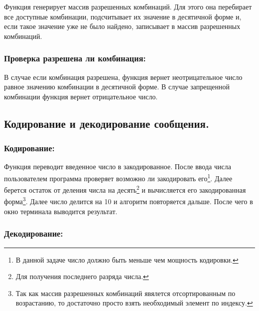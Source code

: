 \documentclass[12pt, a4paper]{report}
\begin{document}


Функция генерирует массив разрешенных комбинаций. Для этого она перебирает все доступные комбинации, подсчитывает их значение в десятичной форме и, если такое значение уже не было найдено, записывает в массив разрешенных комбинаций.

\subsubsection*{Проверка разрешена ли комбинация:}



В случае если комбинация разрешена, функция вернет неотрицательное число равное значению комбинации в десятичной форме. В случае запрещенной комбинации функция вернет отрицательное число.

\newpage

\subsection*{Кодирование и декодирование сообщения.}

\subsubsection*{Кодирование:}



Функция переводит введенное число в закодированное. После ввода числа пользователем программа проверяет возможно ли закодировать его\footnote{В данной задаче число должно быть меньше чем мощность кодировки.}. Далее берется остаток от деления числа на десять\footnote{Для получения последнего разряда числа.} и вычисляется его закодированная форма\footnote{Так как массив разрешенных комбинаций явялется отсортированным по возрастанию, то достаточно просто взять необходимый элемент по индексу.}. Далее число делится на 10 и алгоритм повторяется дальше. После чего в окно терминала выводится результат.

\newpage

\subsubsection*{Декодирование:}


\end{document}
